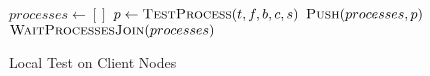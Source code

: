 \begin{algorithm}[ht!]
	\begin{algorithmic}
		\State $processes\gets[]$
		\State $p\gets\Call{TestProcess}{t,f,b,c,s}$
		\State $\Call{Push}{processes, p}$
		\EndFor
		\State $\Call{WaitProcessesJoin}{processes}$
		\EndProcedure
	\end{algorithmic}
	\caption{Local Test on Client Nodes}
	\label{algo:testClientMaster}
\end{algorithm}
